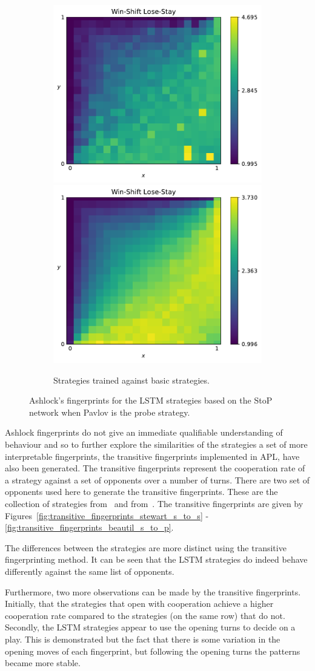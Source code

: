 \begin{figure}[!htbp]
\begin{subfigure}{\textwidth}
        \includegraphics[width=.3\textwidth]{src/chapters/07/img/win_shift_lose_stay_basic_classification_1.pdf}
        \includegraphics[width=.3\textwidth]{src/chapters/07/img/win_shift_lose_stay_basic_classification_0_78.pdf}
        \caption{Strategies trained against basic strategies.}
    \end{subfigure}
    \caption{Ashlock's fingerprints for the LSTM strategies based on the StoP
    network when Pavlov is the probe strategy.}\label{fig:ashlock_fingerprints_pavlov_s_to_p}
\end{figure}

Ashlock fingerprints do not give an immediate qualifiable understanding of behaviour and so
to further explore the similarities of the strategies a set of more
interpretable fingerprints, the transitive fingerprints implemented in APL, have
also been generated. The transitive fingerprints represent the cooperation rate
of a strategy against a set of opponents over a number of turns. There are two
set of opponents used here to generate the transitive fingerprints. These are
the collection of strategies from~\cite{Stewart2012} and
from~\cite{Beaufils1997}. The transitive fingerprints are given by
Figures~\ref{fig:transitive_fingerprints_stewart_s_to_s}
-\ref{fig:transitive_fingerprints_beautil_s_to_p}.

The differences between the strategies are more distinct using the transitive
fingerprinting method. It can be seen that the LSTM strategies do indeed behave
differently against the same list of opponents.

Furthermore, two more observations can be made by the transitive fingerprints.
Initially, that the strategies that open with cooperation achieve a higher
cooperation rate compared to the strategies (on the same row) that do not.
Secondly, the LSTM strategies appear to use the opening turns to decide on a play.
This is demonstrated but the fact that there is some variation in the opening
moves of each fingerprint, but following the opening turns the patterns became
more stable.

